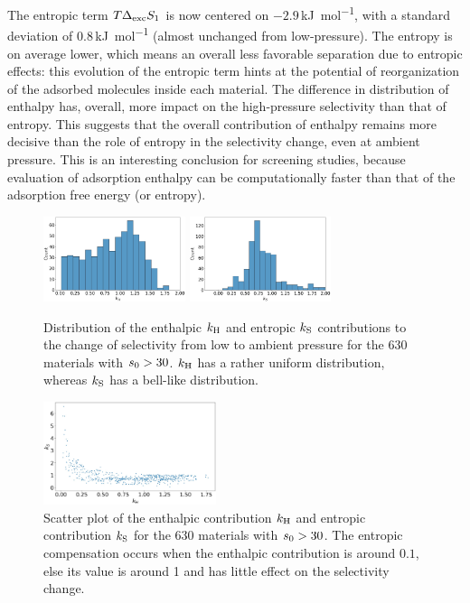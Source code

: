 \documentclass[main.tex]{subfiles}
\begin{document}
  The entropic term $T\Delta_{\text{exc}}S_{\text{1}}$ is now centered on $-2.9$\,\si{\kilo\joule\per\mol}, with a standard deviation of $0.8$\,\si{\kilo\joule\per\mol} (almost unchanged from low-pressure). The entropy is on average lower, which means an overall less favorable separation due to entropic effects: this evolution of the entropic term hints at the potential of reorganization of the adsorbed molecules inside each material. The difference in distribution of enthalpy has, overall, more impact on the high-pressure selectivity than that of entropy. This suggests that the overall contribution of enthalpy remains more decisive than the role of entropy in the selectivity change, even at ambient pressure. This is an interesting conclusion for screening studies, because evaluation of adsorption enthalpy can be computationally faster than that of the adsorption free energy (or entropy).

\begin{figure}[t]
  \centering
    \includegraphics[width=0.37\textwidth]{figures/2-thermo/k_H.jpg}
    \hspace{8mm}
    \includegraphics[width=0.37\textwidth]{figures/2-thermo/k_S.jpg}
    \caption{Distribution of the enthalpic $k_{\text{H}}$ and entropic $k_{\text{S}}$ contributions to the change of selectivity from low to ambient pressure for the 630 materials with $s_{\text{0}}>30$. $k_{\text{H}}$ has a rather uniform distribution, whereas $k_{\text{S}}$ has a bell-like distribution. }
    \label{fgr:distk}
  \end{figure}
  
  \begin{figure}[t]
  \centering
    \includegraphics[width=0.45\textwidth]{figures/2-thermo/k_S_vs_k_H.jpg}
    \caption{Scatter plot of the enthalpic contribution $k_{\text{H}}$ and entropic contribution $k_{\text{S}}$ for the 630 materials with $s_{\text{0}}>30$. The entropic compensation occurs when the enthalpic contribution is around $0.1$, else its value is around 1 and has little effect on the selectivity change.}
    \label{fgr:scatterk}
  \end{figure}
  
\end{document}
